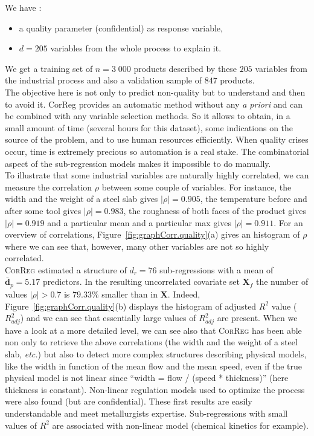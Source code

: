 \documentclass[12pt,a4paper]{report}
\begin{document}
We have :
		\begin{itemize}
			\item a quality parameter (confidential) as response variable,
			\item $d=205$ variables from the whole process to explain it.
		\end{itemize}
We get a training set of $n=3\;000$ products described by these $205$ variables from the industrial process and also a validation sample of $847$ products.\\

The objective here is not only to predict non-quality but to understand and then to avoid it. {\sc CorReg} provides an automatic method without any {\it a priori} and can be combined with any variable selection methods. So it allows to obtain, in a small amount of time (several hours for this dataset), some indications on the source of the problem, and to use human resources efficiently. When quality crises occur, time is extremely precious so automation is a real stake. The combinatorial aspect of the sub-regression models makes it impossible to do manually.\\


To illustrate that some industrial variables are naturally highly correlated, we can measure the correlation $\rho$ between some couple of variables. For instance, the width and the weight of a steel slab gives $|\rho|=0.905$, the temperature before and after some tool gives $|\rho|=0.983$, the  roughness of both faces of the product gives $|\rho|= 0.919$ and a particular mean and a particular max gives $|\rho|=0.911$. For an overview of correlations, Figure~\ref{fig:graphCorr.quality}(a) gives an histogram of $\rho$ where we can see that, however, many other variables are not so highly correlated.\\

\textsc{CorReg} estimated a structure of $d_r=76$ sub-regressions with a mean of $\bar{\boldsymbol{d}}_p=5.17$ predictors. In the resulting uncorrelated covariate set $\boldsymbol{X}_f$ the number of values $|\rho|>0.7$ is $79.33\%$ smaller than in $\boldsymbol{X}$. Indeed, Figure~\ref{fig:graphCorr.quality}(b) displays the histogram of adjusted $R^2$ value ($R^2_{adj}$) and we can see that essentially large values of $R^2_{adj}$ are present. When we have a look at a more detailed level, we can see also that \textsc{CorReg} has been able non only to retrieve the above correlations (the width and the weight of a steel slab, {\it etc.}) but also to detect more complex structures describing physical models, like the width in function of the mean flow and the mean speed, even if the true physical model is not linear since ``width = flow / (speed * thickness)'' (here thickness is constant). Non-linear regulation models used to optimize the process were also found (but are confidential). These first results are easily understandable and meet metallurgists expertise.  Sub-regressions with small values of $R^2$ are associated with non-linear model (chemical kinetics for example).
		
\end{document}
